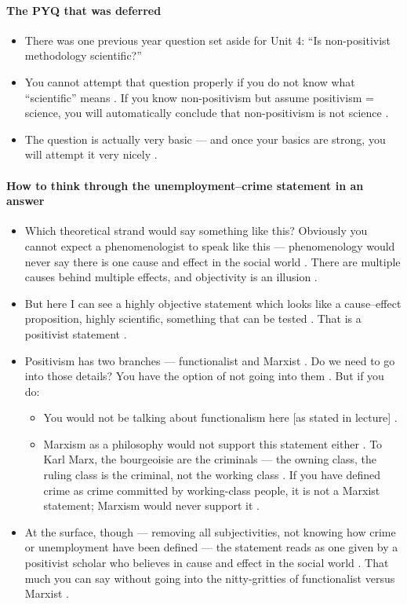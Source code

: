 \paragraph{The PYQ that was deferred}
\begin{itemize}
    \item There was one previous year question set aside for Unit 4: ``Is non-positivist methodology scientific?'' 
    \item You cannot attempt that question properly if you do not know what ``scientific'' means . If you know non-positivism but assume positivism = science, you will automatically conclude that non-positivism is not science .
    \item The question is actually very basic --- and once your basics are strong, you will attempt it very nicely .
\end{itemize}

\paragraph{How to think through the unemployment--crime statement in an answer}
\begin{itemize}
    \item Which theoretical strand would say something like this? Obviously you cannot expect a phenomenologist to speak like this --- phenomenology would never say there is one cause and effect in the social world . There are multiple causes behind multiple effects, and objectivity is an illusion .
    \item But here I can see a highly objective statement which looks like a cause--effect proposition, highly scientific, something that can be tested . That is a positivist statement .
    \item Positivism has two branches --- functionalist and Marxist . Do we need to go into those details? You have the option of not going into them . But if you do:
    \begin{itemize}
        \item You would not be talking about functionalism here [as stated in lecture] .
        \item Marxism as a philosophy would not support this statement either . To Karl Marx, the bourgeoisie are the criminals --- the owning class, the ruling class is the criminal, not the working class . If you have defined crime as crime committed by working-class people, it is not a Marxist statement; Marxism would never support it .
    \end{itemize}
    \item At the surface, though --- removing all subjectivities, not knowing how crime or unemployment have been defined --- the statement reads as one given by a positivist scholar who believes in cause and effect in the social world . That much you can say without going into the nitty-gritties of functionalist versus Marxist .
\end{itemize}

